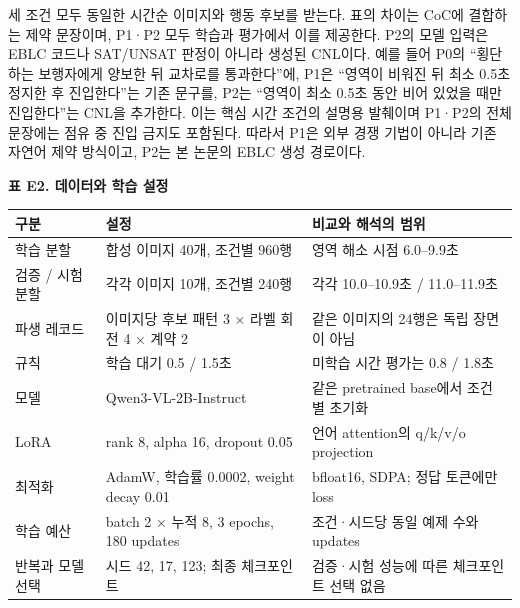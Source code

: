 \documentclass[11pt,a4paper]{article}
\begin{document}
세 조건 모두 동일한 시간순 이미지와 행동 후보를 받는다. 표의 차이는 CoC에 결합하는 제약 문장이며, P1·P2 모두 학습과 평가에서 이를 제공한다. P2의 모델 입력은 EBLC 코드나 SAT/UNSAT 판정이 아니라 생성된 CNL이다. 예를 들어 P0의 “횡단하는 보행자에게 양보한 뒤 교차로를 통과한다”에, P1은 “영역이 비워진 뒤 최소 0.5초 정지한 후 진입한다”는 기존 문구를, P2는 “영역이 최소 0.5초 동안 비어 있었을 때만 진입한다”는 CNL을 추가한다. 이는 핵심 시간 조건의 설명용 발췌이며 P1·P2의 전체 문장에는 점유 중 진입 금지도 포함된다. 따라서 P1은 외부 경쟁 기법이 아니라 기존 자연어 제약 방식이고, P2는 본 논문의 EBLC 생성 경로이다.\par

\par\medskip\noindent\begin{minipage}{\linewidth}
\textbf{표 E2. 데이터와 학습 설정}\par

\par\medskip\noindent\begin{minipage}{\linewidth}\small
\begin{tabular}{@{}>{\raggedright\arraybackslash}p{}>{\raggedright\arraybackslash}p{}>{\raggedright\arraybackslash}p{}@{}}
\toprule
\textbf{구분} & \textbf{설정} & \textbf{비교와 해석의 범위} \\
\midrule
학습 분할 & 합성 이미지 40개, 조건별 960행 & 영역 해소 시점 6.0–9.9초 \\
검증 / 시험 분할 & 각각 이미지 10개, 조건별 240행 & 각각 10.0–10.9초 / 11.0–11.9초 \\
파생 레코드 & 이미지당 후보 패턴 3 × 라벨 회전 4 × 계약 2 & 같은 이미지의 24행은 독립 장면이 아님 \\
규칙 & 학습 대기 0.5 / 1.5초 & 미학습 시간 평가는 0.8 / 1.8초 \\
모델 & Qwen3-VL-2B-Instruct & 같은 pretrained base에서 조건별 초기화 \\
LoRA & rank 8, alpha 16, dropout 0.05 & 언어 attention의 q/k/v/o projection \\
최적화 & AdamW, 학습률 0.0002, weight decay 0.01 & bfloat16, SDPA; 정답 토큰에만 loss \\
학습 예산 & batch 2 × 누적 8, 3 epochs, 180 updates & 조건·시드당 동일 예제 수와 updates \\
반복과 모델 선택 & 시드 42, 17, 123; 최종 체크포인트 & 검증·시험 성능에 따른 체크포인트 선택 없음 \\
\bottomrule\end{tabular}\end{minipage}\par\medskip
\end{minipage}\par\medskip
\end{document}
